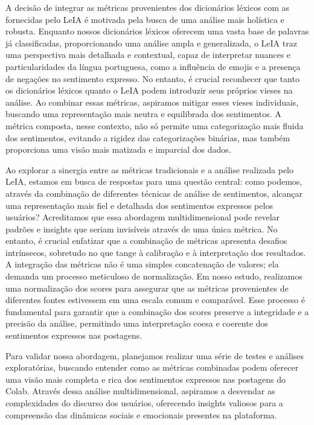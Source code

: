 A decisão de integrar as métricas provenientes dos dicionários léxicos com as fornecidas pelo LeIA é motivada pela busca de uma análise mais holística e robusta. Enquanto nossos dicionários léxicos oferecem uma vasta base de palavras já classificadas, proporcionando uma análise ampla e generalizada, o LeIA traz uma perspectiva mais detalhada e contextual, capaz de interpretar nuances e particularidades da língua portuguesa, como a influência de emojis e a presença de negações no sentimento expresso. No entanto, é crucial reconhecer que tanto os dicionários léxicos quanto o LeIA podem introduzir seus próprios vieses na análise. Ao combinar essas métricas, aspiramos mitigar esses vieses individuais, buscando uma representação mais neutra e equilibrada dos sentimentos. A métrica composta, nesse contexto, não só permite uma categorização mais fluida dos sentimentos, evitando a rigidez das categorizações binárias, mas também proporciona uma visão mais matizada e imparcial dos dados.

Ao explorar a sinergia entre as métricas tradicionais e a análise realizada pelo LeIA, estamos em busca de respostas para uma questão central: como podemos, através da combinação de diferentes técnicas de análise de sentimentos, alcançar uma representação mais fiel e detalhada dos sentimentos expressos pelos usuários? Acreditamos que essa abordagem multidimensional pode revelar padrões e insights que seriam invisíveis através de uma única métrica. No entanto, é crucial enfatizar que a combinação de métricas apresenta desafios intrínsecos, sobretudo no que tange à calibração e à interpretação dos resultados. A integração das métricas não é uma simples concatenação de valores; ela demanda um processo meticuloso de normalização. Em nosso estudo, realizamos uma normalização dos scores para assegurar que as métricas provenientes de diferentes fontes estivessem em uma escala comum e comparável. Esse processo é fundamental para garantir que a combinação dos scores preserve a integridade e a precisão da análise, permitindo uma interpretação coesa e coerente dos sentimentos expressos nas postagens.

Para validar nossa abordagem, planejamos realizar uma série de testes e análises exploratórias, buscando entender como as métricas combinadas podem oferecer uma visão mais completa e rica dos sentimentos expressos nas postagens do Colab. Através dessa análise multidimensional, aspiramos a desvendar as complexidades do discurso dos usuários, oferecendo insights valiosos para a compreensão das dinâmicas sociais e emocionais presentes na plataforma.

